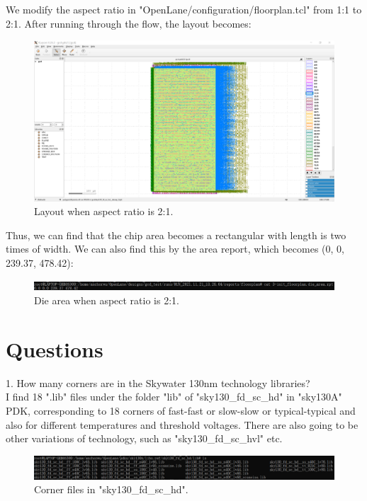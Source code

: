 \documentclass[a4paper]{article}
\begin{document}
We modify the aspect ratio in  "OpenLane/configuration/floorplan.tcl" from 1:1 to 2:1. After running through the flow, the layout becomes: 
\begin{figure}[H]
    \centering
    \includegraphics[width=1\textwidth]{exercise_2_5_1.png}
    \caption{Layout when aspect ratio is 2:1.}
\end{figure}
Thus, we can find that the chip area becomes a rectangular with length is two times of width. We can also find this by the area report, which becomes (0, 0, 239.37, 478.42):
\begin{figure}[H]
    \centering
    \includegraphics[width=1\textwidth]{exercise_2_5_2.png}
    \caption{Die area when aspect ratio is 2:1.}
\end{figure}

\section{Questions}
1. How many corners are in the Skywater 130nm technology libraries?\\
I find 18 ".lib" files under the folder "lib" of "sky130\_fd\_sc\_hd" in "sky130A" PDK, corresponding to 18 corners of fast-fast or slow-slow or typical-typical and also for different temperatures and threshold voltages. There are also going to be other variations of technology, such as "sky130\_fd\_sc\_hvl" etc. 
\begin{figure}[H]
    \centering
    \includegraphics[width=1\textwidth]{part4_1.png}
    \caption{Corner files in "sky130\_fd\_sc\_hd".}
\end{figure}
\end{document}
